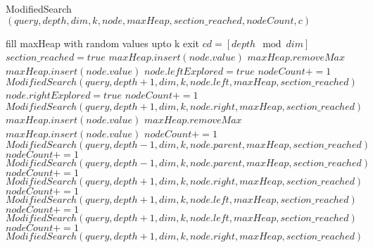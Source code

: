 \documentclass{article}
\begin{document}
\begin{algorithm}
    \caption{ModifiedSearch $(query, depth, dim, k, node, maxHeap, section\_reached, nodeCount, c)$}\label{alg:cap}
    \begin{algorithmic}
    {\ttfamily \footnotesize{
                \State fill maxHeap with random values upto k
            \EndIf
            \State exit
        \EndIf
        \State $cd = [depth \mod dim]$
            \State $section\_reached = true$
        \EndIf
            \State $maxHeap.insert(node.value)$
            \State $maxHeap.removeMax$
            \State $maxHeap.insert(node.value)$
        \EndIf
                \State $node.leftExplored = true$
                \State $nodeCount += 1$
                \State $ModifiedSearch(query, depth+1, dim, k, node.left, maxHeap, section\_reached)$
                \State $node.rightExplored = true$
                \State $nodeCount += 1$
                \State $ModifiedSearch(query, depth+1, dim, k, node.right, maxHeap, section\_reached)$
            \EndIf
        \Else
                \State $maxHeap.insert(node.value)$
                \State $maxHeap.removeMax$
                \State $maxHeap.insert(node.value)$
            \EndIf
                \State $nodeCount += 1$
                \State $ModifiedSearch(query, depth-1, dim, k, node.parent, maxHeap, section\_reached)$
            \Else
                    \State $nodeCount += 1$
                    \State $ModifiedSearch(query, depth-1, dim, k, node.parent, maxHeap, section\_reached)$
                    \State $nodeCount += 1$
                    \State $ModifiedSearch(query, depth+1, dim, k, node.right, maxHeap, section\_reached)$
                    \State $nodeCount += 1$
                    \State $ModifiedSearch(query, depth+1, dim, k, node.left, maxHeap, section\_reached)$
                    \State $nodeCount += 1$
                    \State $ModifiedSearch(query, depth+1, dim, k, node.left, maxHeap, section\_reached)$
                    \State $nodeCount += 1$
                    \State $ModifiedSearch(query, depth+1, dim, k, node.right, maxHeap, section\_reached)$
                \EndIf
            \EndIf
        \EndIf
    }}    
    \end{algorithmic}
\end{algorithm}
\end{document}
